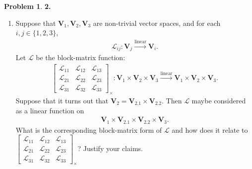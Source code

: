 \documentclass{article}
\theoremstyle{definition}
\newtheorem*{prob*}{Problem}
\newcommand{\V}{\mathbf{V}}
\newcommand{\lag}{\mathcal{L}}
\newcommand{\lin}{\overset{\text{linear}}{\longrightarrow}}
\begin{document}
\begin{prob*}\textbf{2. }\\
	
	\begin{enumerate}
	\item Suppose that $\V_1, \V_2, \V_3$ are non-trivial vector spaces, and for each $i,j \in \{1,2,3\}$,
	\begin{align*}
	\lag_{ij} : \V_j \lin \V_i.
	\end{align*}
	Let $\lag$ be the block-matrix function:
	\begin{align*}
	\begin{bmatrix}
	\lag_{11} & \lag_{12} & \lag_{13}\\
	\lag_{21} & \lag_{22} & \lag_{23}\\
	\lag_{31} & \lag_{32} & \lag_{33}
	\end{bmatrix}_\times : \V_1\times \V_2 \times \V_3 \lin \V_1\times \V_2\times \V_3.
	\end{align*}
	Suppose that it turns out that $\V_2 = \V_{2.1}\times \V_{2.2}$. Then $\lag$ maybe considered as a linear function on
	\begin{align*}
	\V_1 \times \V_{2.1}\times \V_{2.2} \times \V_3. 
	\end{align*}
	What is the corresponding block-matrix form of $\lag$ and how does it relate to $\begin{bmatrix}
	\lag_{11} & \lag_{12} & \lag_{13}\\
	\lag_{21} & \lag_{22} & \lag_{23}\\
	\lag_{31} & \lag_{32} & \lag_{33}
	\end{bmatrix}_\times$? Justify your claims.\\
	

\end{enumerate}
\end{prob*}
\end{document}
